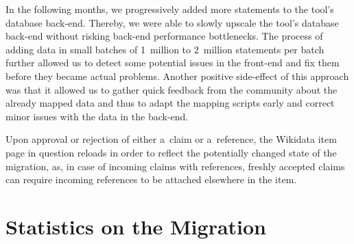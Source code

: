 \documentclass{sig-alternate-2013}
\begin{document}
In the following months, we progressively added more statements to the tool's database back-end.
Thereby, we were able to slowly upscale the tool's database back-end
without risking back-end performance bottlenecks.
The process of adding data in small batches of 1~million to 2~million statements per batch
further allowed us to detect some potential issues in the front-end
and fix them before they became actual problems.
Another positive side-effect of this approach was that it allowed us to gather quick feedback
from the community about the already mapped data and thus to adapt the mapping scripts early
and correct minor issues with the data in the back-end.

Upon approval or rejection of either a~claim or a~reference,
the Wikidata item page in question reloads in order to reflect
the potentially changed state of the migration, as,
in case of incoming claims with references, freshly accepted claims
can require incoming references to be attached elsewhere in the item.

\section{Statistics on the Migration}\label{sec:statistics-of-the-migration}
\end{document}
